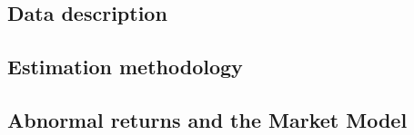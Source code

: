 
\subsection{Data description}


\subsection{Estimation methodology}


\subsection{Abnormal returns and the Market Model}






\begin{figure}[!tbp]
  \centering
    

\end{figure}
